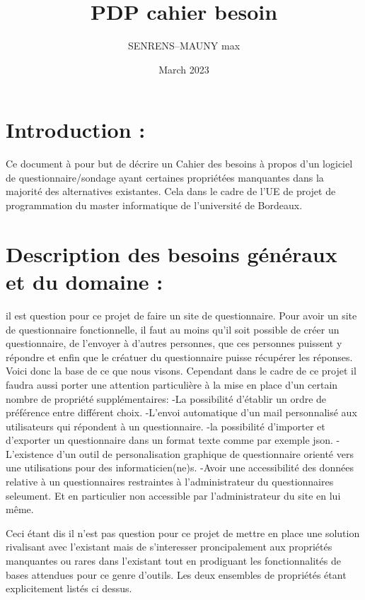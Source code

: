 \documentclass{article}
\title{PDP cahier besoin}
\author{SENRENS--MAUNY max }
\date{March 2023}
\begin{document}
\maketitle

\section{Introduction :}
Ce document à pour but de décrire un Cahier des besoins à propos d'un logiciel de questionnaire/sondage ayant certaines propriétées manquantes dans la majorité des alternatives existantes. Cela dans le cadre de l'UE de projet de programmation du master informatique de l'université de Bordeaux.

\section{Description des besoins généraux et du domaine :}

il est question pour ce projet de faire un site de questionnaire. Pour avoir un site de questionnaire fonctionnelle, il faut au moins qu'il soit possible de créer un questionnaire, de l'envoyer à d'autres personnes, que ces personnes puissent y répondre et enfin que le créatuer du questionnaire puisse récupérer les réponses. Voici donc la base de ce que nous visons. Cependant dans le cadre de ce projet il faudra aussi porter une attention particulière à la mise en place d'un certain nombre de propriété supplémentaires:\newline\newline
-La possibilité d'établir un ordre de préférence entre différent choix.\newline
-L'envoi automatique d'un mail personnalisé aux utilisateurs qui répondent à un questionnaire.\newline
-la possibilité d'importer et d'exporter un questionnaire dans un format texte comme par exemple json.\newline
-L'existence d'un outil de personalisation graphique de questionnaire orienté vers une utilisations pour des informaticien(ne)s.\newline
-Avoir une accessibilité des données relative à un questionnaires restraintes à l'administrateur du questionnaires seleument. Et en particulier non accessible par l'administrateur du site en lui même.\newline\newline

Ceci étant dis il n'est pas question pour ce projet de mettre en place une solution rivalisant avec l'existant mais de s'interesser proncipalement aux propriétés manquantes ou rares dans l'existant tout en prodiguant les fonctionnalités de bases attendues pour ce genre d'outils. Les deux ensembles de propriétés étant explicitement listés ci dessus.
\end{document}
